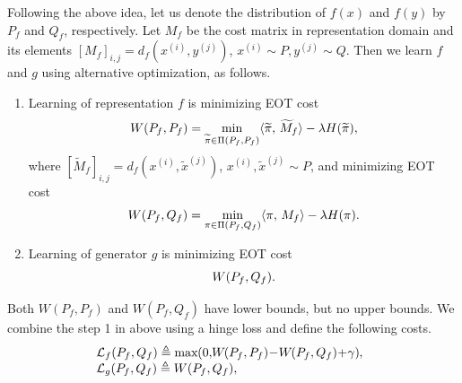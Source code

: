 Following the above idea, let us denote the distribution of $f(x)$ and $f(y)$ by $P_f$ and $Q_f$, respectively. Let $M_f$ be the cost matrix in representation domain and its elements $[M_f]_{i,j} = d_f(x^{(i)}, y^{(j)})$, $x^{(i)} \sim P, y^{(j)}\sim Q$.  Then we learn $f$ and $g$ using alternative optimization, as follows. \vspace{-8pt}
\begin{enumerate}
\item Learning of representation $f$ is minimizing EOT cost\vspace{-6pt}
  \begin{equation}\label{eq-sim-in}
    W(P_f, P_f) = \min_{\widetilde{\pi} \in \Pi(P_f, P_f) } \dotp{\widetilde{\pi}}{\widetilde{M}_f} - \la H(\widetilde{\pi}),\vspace{-6pt}
  \end{equation}
  where $[\widetilde{M}_f]_{i,j} = d_f(x^{(i)}, \tilde{x}^{(j)})$, $x^{(i)}, \tilde{x}^{(j)} \sim P$, and minimizing EOT cost\vspace{-6pt}
  \begin{equation}\label{eq-sim-ex}
    W(P_f, Q_f) = \min_{{\pi} \in \Pi(P_f, Q_f) } \dotp{{\pi}}{M_f} - \la H({\pi}).\vspace{-8pt}
  \end{equation}
\item Learning of generator $g$ is minimizing EOT cost\vspace{-6pt}
  \begin{equation}
    W(P_f, Q_f).\vspace{-8pt}
  \end{equation}
\end{enumerate} 
Both $W(P_f, P_f)$ and $W(P_f, Q_f)$ have lower bounds, but no upper bounds. 
We combine the step 1 in above using a hinge loss and define the following costs.\vspace{-2pt}
\begin{equation}
  \hspace{-15pt}
  \begin{array}{rl}
    &\Ll_f(P_f, Q_f) \triangleq \max\hspace{-2pt}\left(0,\hspace{-2pt} W\hspace{-1pt}(P_f,P_f)\hspace{-2pt}-\hspace{-2pt} W\hspace{-1pt}(P_f,Q_f) \hspace{-2pt}+\hspace{-2pt} \gamma \right)\hspace{-2pt},\\
    &\Ll_g(P_f,Q_f) \triangleq W(P_f,Q_f),
  \end{array} \vspace{-2pt}
\end{equation}
